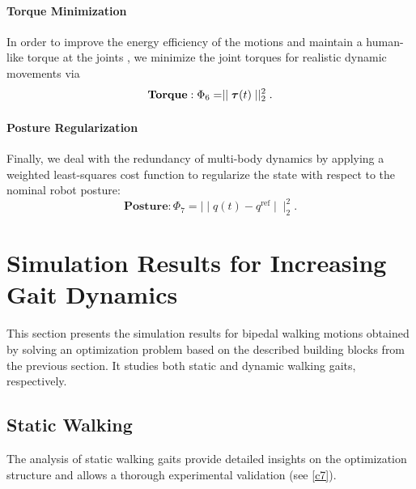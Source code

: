 \paragraph{Torque Minimization}
In order to improve the energy efficiency of the motions and maintain a human-like torque at the joints \cite{kim1994modeling}, we minimize the joint torques for realistic dynamic movements via
\begin{equation*} 
\textbf{Torque}: \Phi_6=\mid\mid \bm{\mathit{\tau}}(t)\mid\mid^2_2.
\end{equation*}
\paragraph{Posture Regularization}
Finally, we deal with the redundancy of multi-body dynamics by applying a weighted least-squares cost function to regularize the state with respect to the nominal robot posture:
\begin{equation*} 
\textbf{Posture}: \Phi_7=\mid\mid q(t)-q^\text{ref}\mid\mid^2_2.
\end{equation*}


\section{Simulation Results for Increasing Gait Dynamics}\label{sec:BipedSimulation}
This section presents the simulation results for bipedal walking motions obtained by solving an optimization problem based on the described building blocks from the previous section. It studies both static and dynamic walking gaits, respectively.

\subsection{Static Walking}
The analysis of static walking gaits provide detailed insights on the optimization structure and allows a thorough experimental validation (see \cref{c7}).

